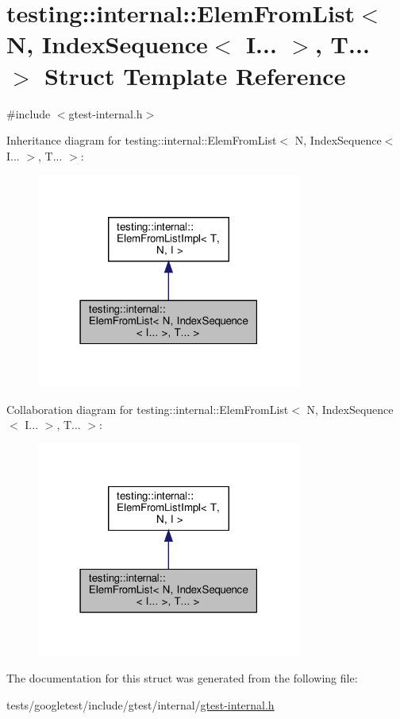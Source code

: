 \hypertarget{structtesting_1_1internal_1_1ElemFromList_3_01N_00_01IndexSequence_3_01I_8_8_8_01_4_00_01T_8_8_8_01_4}{}\section{testing\+:\+:internal\+:\+:Elem\+From\+List$<$ N, Index\+Sequence$<$ I... $>$, T... $>$ Struct Template Reference}
\label{structtesting_1_1internal_1_1ElemFromList_3_01N_00_01IndexSequence_3_01I_8_8_8_01_4_00_01T_8_8_8_01_4}


{\ttfamily \#include $<$gtest-\/internal.\+h$>$}



Inheritance diagram for testing\+:\+:internal\+:\+:Elem\+From\+List$<$ N, Index\+Sequence$<$ I... $>$, T... $>$\+:\nopagebreak
\begin{figure}[H]
\begin{center}
\leavevmode
\includegraphics[width=247pt]{structtesting_1_1internal_1_1ElemFromList_3_01N_00_01IndexSequence_3_01I_8_8_8_01_4_00_01T_8_8_8_01_4__inherit__graph}
\end{center}
\end{figure}


Collaboration diagram for testing\+:\+:internal\+:\+:Elem\+From\+List$<$ N, Index\+Sequence$<$ I... $>$, T... $>$\+:\nopagebreak
\begin{figure}[H]
\begin{center}
\leavevmode
\includegraphics[width=247pt]{structtesting_1_1internal_1_1ElemFromList_3_01N_00_01IndexSequence_3_01I_8_8_8_01_4_00_01T_8_8_8_01_4__coll__graph}
\end{center}
\end{figure}


The documentation for this struct was generated from the following file\+:\begin{DoxyCompactItemize}
\item 
tests/googletest/include/gtest/internal/\hyperlink{gtest-internal_8h}{gtest-\/internal.\+h}\end{DoxyCompactItemize}
